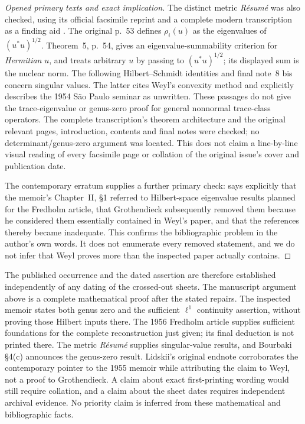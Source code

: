 \begin{proof}[Opened primary texts and exact implication]
The distinct metric \emph{R\'esum\'e} was also checked, using its official
facsimile reprint and a complete modern transcription as a finding aid
\cite[\S3, no.~6, pp.~53--56; final note 8 bis, p.~77]{algMetricResumeFacsimile}.
The original p.~53 defines $\rho_i(u)$ as the eigenvalues of
$(u^*u)^{1/2}$. Theorem~5, p.~54, gives an eigenvalue-summability criterion
for \emph{Hermitian} $u$, and treats arbitrary $u$ by passing to
$(u^*u)^{1/2}$; its displayed sum is the nuclear norm. The following
Hilbert--Schmidt identities and final note~8 bis concern singular values.
The latter cites Weyl's convexity method and explicitly describes the
1954 S\~ao Paulo seminar as unwritten. These passages do not give the
trace-eigenvalue or genus-zero proof for general nonnormal trace-class
operators. The complete transcription's theorem architecture and the
original relevant pages, introduction, contents and final notes were
checked; no determinant/genus-zero argument was located. This does not
claim a line-by-line visual reading of every facsimile page or collation
of the original issue's cover and publication date.

The contemporary erratum supplies a further primary check:
\cite[p.~119]{Grothendieck1956Erratum} says explicitly that the memoir's
Chapter~II, \S1 referred to Hilbert-space eigenvalue results planned for the
Fredholm article, that Grothendieck subsequently removed them because he
considered them essentially contained in Weyl's paper, and that the
references thereby became inadequate. This confirms the bibliographic
problem in the author's own words. It does not enumerate every removed
statement, and we do not infer that Weyl proves more than the inspected
paper actually contains.
\end{proof}

The published occurrence and the dated assertion are therefore established
independently of any dating of the crossed-out sheets. The manuscript
argument above is a complete mathematical proof after the stated repairs.
The inspected memoir states both genus zero and the sufficient $\ell^1$
continuity assertion, without proving those Hilbert inputs there. The
1956 Fredholm article supplies sufficient foundations for the complete
reconstruction just given; its final deduction is not printed there.
The metric \emph{R\'esum\'e} supplies singular-value results, and
Bourbaki \S4(c) announces the genus-zero result. Lidskii's original endnote
corroborates the contemporary pointer to the 1955 memoir while attributing
the claim to Weyl, not a proof to Grothendieck. A claim about exact
first-printing wording would still require collation, and a claim about
the sheet dates requires independent archival evidence. No priority claim
is inferred from these mathematical and bibliographic facts.
